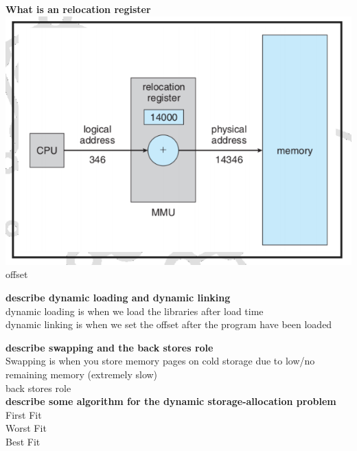 \documentclass[a4paper,10pt,titlepage]{report}
\begin{document}
\textbf{What is an relocation register}\\
\includegraphics[scale=0.5]{relocation.png}
offset

\vspace{5mm}

\textbf{describe dynamic loading and dynamic linking} \\
\hspace{10mm}dynamic loading is when we load the libraries after load time\\
\hspace{10mm}dynamic linking is when we set the offset after the program have been loaded \\ 
\vspace{5mm}

\textbf{describe swapping and the back stores role} \\
\hspace{10mm} Swapping is when you store memory pages on cold storage due to low/no remaining memory (extremely slow)\\
\hspace{10mm} back stores role \\


\vspace{5mm}
\textbf{describe some algorithm for the dynamic storage-allocation problem} \\
\hspace{10mm} First Fit \\
\hspace{10mm} Worst Fit \\
\hspace{10mm} Best Fit \\
\end{document}
